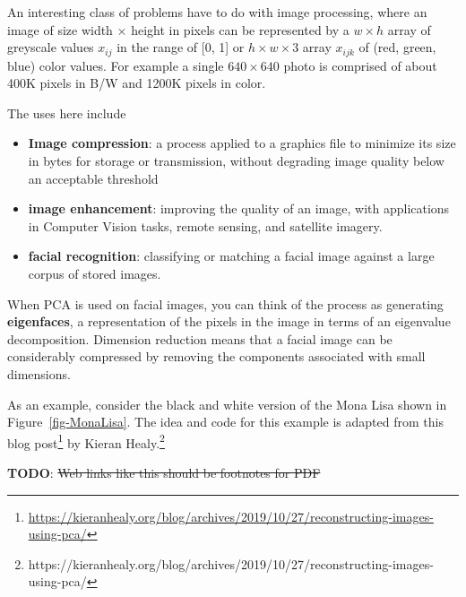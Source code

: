 \documentclass[
  letterpaper,
  10pt,
  krantz2]{krantz}
\providecommand{\tightlist}{%
  \setlength{\itemsep}{0pt}\setlength{\parskip}{0pt}}\usepackage{longtable,booktabs,array}
\providecommand{\href}[2]{#2\footnote{\url{#1}}}
\begin{document}
An interesting class of problems have to do with image processing, where
an image of size width \(\times\) height in pixels can be represented by
a \(w \times h\) array of greyscale values \(x_{ij}\) in the range of
{[}0, 1{]} or \(h \times w \times 3\) array \(x_{ijk}\) of (red, green,
blue) color values. For example a single \(640 \times 640\) photo is
comprised of about 400K pixels in B/W and 1200K pixels in color.

The uses here include

\begin{itemize}
\tightlist
\item
  \textbf{Image compression}: a process applied to a graphics file to
  minimize its size in bytes for storage or transmission, without
  degrading image quality below an acceptable threshold
\item
  \textbf{image enhancement}: improving the quality of an image, with
  applications in Computer Vision tasks, remote sensing, and satellite
  imagery.
\item
  \textbf{facial recognition}: classifying or matching a facial image
  against a large corpus of stored images.
\end{itemize}

When PCA is used on facial images, you can think of the process as
generating \textbf{eigenfaces}, a representation of the pixels in the
image in terms of an eigenvalue decomposition. Dimension reduction means
that a facial image can be considerably compressed by removing the
components associated with small dimensions.

As an example, consider the black and white version of the Mona Lisa
shown in Figure~\ref{fig-MonaLisa}. The idea and code for this example
is adapted from this
\href{https://kieranhealy.org/blog/archives/2019/10/27/reconstructing-images-using-pca/}{blog
post} by Kieran Healy.\footnote{https://kieranhealy.org/blog/archives/2019/10/27/reconstructing-images-using-pca/}

\textbf{TODO}: \st{Web links like this should be footnotes for PDF}
\end{document}
